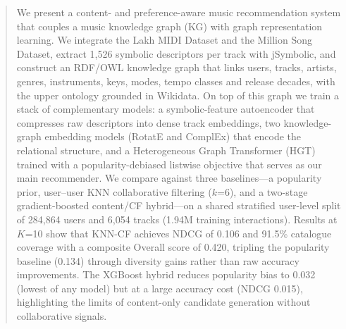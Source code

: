 \begin{abstract}
We present a content- and preference-aware music recommendation system that
couples a music knowledge graph (KG) with graph representation learning. We
integrate the Lakh MIDI Dataset and the Million Song Dataset, extract
1{,}526 symbolic descriptors per track with jSymbolic, and construct an
RDF/OWL knowledge graph that links users, tracks, artists, genres,
instruments, keys, modes, tempo classes and release decades, with the upper
ontology grounded in Wikidata. On top of this graph we train a stack of
complementary models: a symbolic-feature autoencoder that compresses raw
descriptors into dense track embeddings, two knowledge-graph embedding
models (RotatE and ComplEx) that encode the relational structure, and a
Heterogeneous Graph Transformer (HGT) trained with a popularity-debiased
listwise objective that serves as our main recommender. We compare against three baselines---a popularity prior, user--user KNN
collaborative filtering ($k$=6), and a two-stage gradient-boosted
content/CF hybrid---on a shared stratified user-level split of 284{,}864
users and 6{,}054 tracks (1.94M training interactions). Results at $K$=10
show that KNN-CF achieves NDCG of 0.106 and 91.5\% catalogue coverage with
a composite Overall score of 0.420, tripling the popularity baseline (0.134)
through diversity gains rather than raw accuracy improvements. The XGBoost
hybrid reduces popularity bias to 0.032 (lowest of any model) but at a large
accuracy cost (NDCG 0.015), highlighting the limits of content-only candidate
generation without collaborative signals.
\end{abstract}
